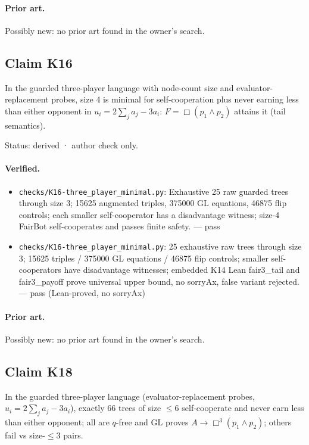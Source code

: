 \documentclass{article}
\begin{document}
\paragraph{Prior art.} Possibly new: no prior art found in the owner's search.

\subsection*{Claim K16}

In the guarded three-player language with node-count size and evaluator-replacement probes, size 4 is minimal for self-cooperation plus never earning less than either opponent in $u_i=2\sum_j a_j-3a_i$: $F=\Box(p_1\land p_2)$ attains it (tail semantics).

Status: derived · author check only.

\paragraph{Verified.}
\begin{itemize}
\item \texttt{checks/K16-three\_player\_minimal.py}: Exhaustive 25 raw guarded trees through size 3; 15625 augmented triples, 375000 GL equations, 46875 flip controls; each smaller self-cooperator has a disadvantage witness; size-4 FairBot self-cooperates and passes finite safety. --- pass
\item \texttt{checks/K16-three\_player\_minimal.py}: 25 exhaustive raw trees through size 3; 15625 triples / 375000 GL equations / 46875 flip controls; smaller self-cooperators have disadvantage witnesses; embedded K14 Lean fair3\_tail and fair3\_payoff prove universal upper bound, no sorryAx, false variant rejected. --- pass (Lean-proved, no sorryAx)
\end{itemize}

\paragraph{Prior art.} Possibly new: no prior art found in the owner's search.

\subsection*{Claim K18}

In the guarded three-player language (evaluator-replacement probes, $u_i=2\sum_j a_j-3a_i$), exactly 66 trees of size $\le6$ self-cooperate and never earn less than either opponent; all are $q$-free and GL proves $A\to\Box^3(p_1\land p_2)$; others fail vs size-$\le3$ pairs.
\end{document}
